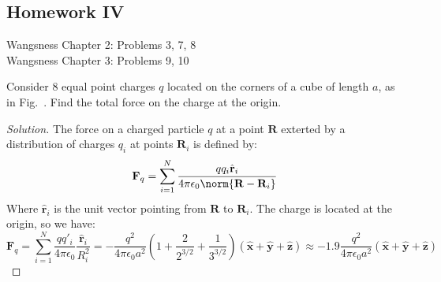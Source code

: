         \subsection{Homework IV}
            Wangsness Chapter 2: Problems 3, 7, 8\\
            Wangsness Chapter 3: Problems 9, 10
            \begin{problem}[Wangsness 2-3]
                \label{problem:EMAG_wangsness_2_3}
                Consider $8$ equal point charges $q$ located on
                the corners of a cube of length $a$, as in
                Fig.~.
                Find the total force on the charge at the origin.
            \end{problem}
            \begin{proof}[Solution]
                The force on a charged particle $q$ at a point $\mathbf{R}$
                exterted by a distribution of charges $q_{i}$ at points
                $\mathbf{R}_{i}$ is defined by:
                \begin{equation*}
                    \mathbf{F}_{q}
                    =\sum_{i=1}^{N}
                    \frac{qq_{i}\hat{\mathbf{r}}_{i}}
                         {4\pi\epsilon_{0}\norm{\mathbf{R}-\mathbf{R}_{i}}}
                \end{equation*}
                Where $\hat{\mathbf{r}}_{i}$ is the unit vector
                pointing from $\mathbf{R}$ to $\mathbf{R}_{i}$.
                The charge is located at the origin, so we have:
                \begin{equation*}
                    \mathbf{F}_q=
                    \sum_{i=1}^{N}\frac{qq'_{i}}{4\pi\epsilon_0}
                    \frac{\hat{\mathbf{r}}_{i}}{R_{i}^{2}}
                    =-\frac{q^{2}}{4\pi \epsilon_0 a^{2}}
                    (1+\frac{2}{2^{3/2}}+\frac{1}{3^{3/2}})
                    (\hat{\mathbf{x}}+\hat{\mathbf{y}}
                    +\hat{\mathbf{z}})
                    \approx-1.9\frac{q^{2}}{4\pi\epsilon_{0}a^{2}}
                    (\hat{\mathbf{x}}
                    +\hat{\mathbf{y}}
                    +\hat{\mathbf{z}})
                \end{equation*}
            \end{proof}
